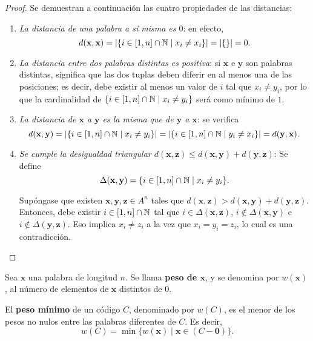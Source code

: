 \begin{proof}
	Se demuestran a continuación las cuatro propiedades de las distancias:
	\begin{enumerate}
		\item \textit{La distancia de una palabra a sí misma es $0$}: en efecto,
		\[d(\textbf{x}, \textbf{x}) = |\{i\in[1,n]\cap\mathbb{N} \mid x_i \neq x_i\}| = |\{\}| = 0.\]
		\item \textit{La distancia entre dos palabras distintas es positiva}: si $\textbf{x}$ e $\textbf{y}$ son palabras distintas, significa que las dos tuplas deben diferir en al menos una de las posiciones; es decir, debe existir al menos un valor de $i$ tal que $x_i \neq y_i$, por lo que la cardinalidad de $\{i \in [1, n]\cap\mathbb{N} \mid x_i \neq y_i\}$ será como mínimo de $1$.
		\item \textit{La distancia de $\textbf{x}$ a $\textbf{y}$ es la misma que de $\textbf{y}$ a $\textbf{x}$}: se verifica
		\[d(\textbf{x}, \textbf{y}) = |\{i\in[1,n]\cap\mathbb{N} \mid x_i \neq y_i\}| = |\{i\in[1,n]\cap\mathbb{N} \mid y_i \neq x_i\}| = d(\textbf{y}, \textbf{x}).\]
		\item \textit{Se cumple la desigualdad triangular $d(\textbf{x}, \textbf{z}) \leq d(\textbf{x}, \textbf{y}) + d(\textbf{y}, \textbf{z})$}:
		Se define
		\[\Delta(\textbf{x}, \textbf{y}) = \{i\in[1,n]\cap\mathbb{N} \mid x_i \neq y_i\}.\]
		
		Supóngase que existen $\textbf{x}, \textbf{y}, \textbf{z} \in A^n$ tales que $d(\textbf{x}, \textbf{z}) > d(\textbf{x}, \textbf{y}) + d(\textbf{y}, \textbf{z})$. Entonces, debe existir $i \in [1, n]\cap\mathbb{N}$ tal que $i \in \Delta(\textbf{x}, \textbf{z})$, $i \notin \Delta(\textbf{x}, \textbf{y})$ e $i \notin \Delta(\textbf{y}, \textbf{z})$. Eso implica $x_i \neq z_i$ a la vez que $x_i = y_i = z_i$, lo cual es una contradicción.
	\end{enumerate}
\end{proof}

\begin{definition}
	Sea $\textbf{x}$ una palabra de longitud $n$. Se llama \textbf{peso de $\textbf{x}$}, y se denomina por $w(\textbf{x})$, al número de elementos de $\textbf{x}$ distintos de $0$.
\end{definition}

\begin{definition}
	El \textbf{peso mínimo} de un código $C$, denominado por $w(C)$, es el menor de los pesos no nulos entre las palabras diferentes de $C$. Es decir,
	\[w(C) = \min\{w(\textbf{x}) \mid \textbf{x}\in (C - \mathbf{0})\}.\]
\end{definition}

